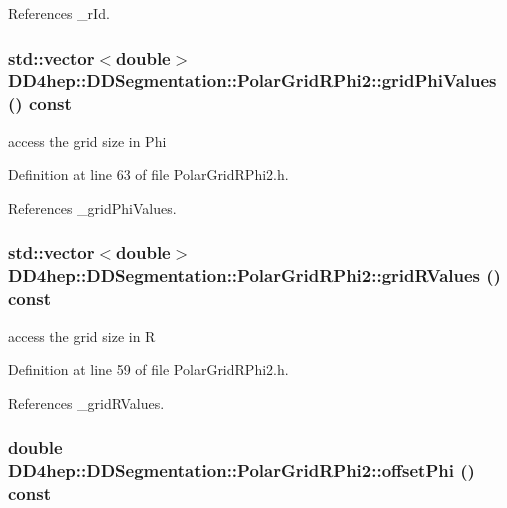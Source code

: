 References \_\-rId.\hypertarget{class_d_d4hep_1_1_d_d_segmentation_1_1_polar_grid_r_phi2_af4f179409116da086b120f46ab3433ec}{
\subsubsection[{gridPhiValues}]{\setlength{\rightskip}{0pt plus 5cm}std::vector$<$double$>$ DD4hep::DDSegmentation::PolarGridRPhi2::gridPhiValues () const}}
\label{class_d_d4hep_1_1_d_d_segmentation_1_1_polar_grid_r_phi2_af4f179409116da086b120f46ab3433ec}


access the grid size in Phi 

Definition at line 63 of file PolarGridRPhi2.h.

References \_\-gridPhiValues.\hypertarget{class_d_d4hep_1_1_d_d_segmentation_1_1_polar_grid_r_phi2_ad0fa4b4b84d24247dc74fc4602619ba8}{
\subsubsection[{gridRValues}]{\setlength{\rightskip}{0pt plus 5cm}std::vector$<$double$>$ DD4hep::DDSegmentation::PolarGridRPhi2::gridRValues () const}}
\label{class_d_d4hep_1_1_d_d_segmentation_1_1_polar_grid_r_phi2_ad0fa4b4b84d24247dc74fc4602619ba8}


access the grid size in R 

Definition at line 59 of file PolarGridRPhi2.h.

References \_\-gridRValues.\hypertarget{class_d_d4hep_1_1_d_d_segmentation_1_1_polar_grid_r_phi2_a2a77b6a183ab9fa40e0001f4ac723cf7}{
\subsubsection[{offsetPhi}]{\setlength{\rightskip}{0pt plus 5cm}double DD4hep::DDSegmentation::PolarGridRPhi2::offsetPhi () const}}
\label{class_d_d4hep_1_1_d_d_segmentation_1_1_polar_grid_r_phi2_a2a77b6a183ab9fa40e0001f4ac723cf7}


